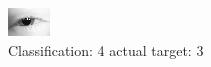 \begin{figure}[h!]
\begin{center}
\includegraphics[width=0.60\columnwidth]{figures/ID152_class_4_target_3.png}
\end{center}
\caption{ Classification: 4 actual target: 3}
\label{fig:ID152_class_4_target_3}
\end{figure}
